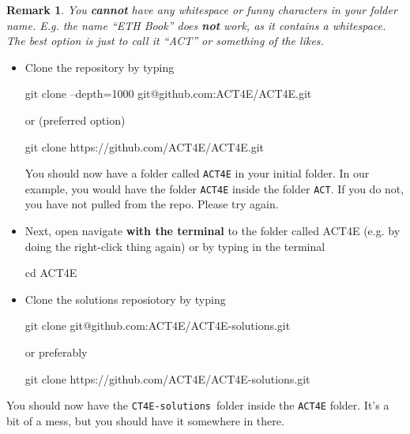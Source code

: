 \documentclass{article}
\newtheorem{remark}{Remark}
\begin{document}
    \begin{remark}
        You \textbf{cannot} have any whitespace or funny characters in your folder name.
        E.g. the name ``ETH Book'' does \textbf{not} work, as it contains a whitespace.
        The best option is just to call it ``ACT'' or something of the likes.
    \end{remark}
    \begin{itemize}
        \item Clone the repository by typing
              \begin{bashcode}
                  git clone --depth=1000 git@github.com:ACT4E/ACT4E.git
              \end{bashcode}
              or (preferred option)
              \begin{bashcode}
                  git clone https://github.com/ACT4E/ACT4E.git
              \end{bashcode}
              You should now have a folder called \texttt{ACT4E} in your initial folder.
              In our example, you would have the folder \texttt{ACT4E} inside the folder \texttt{ACT}.
              If you do not, you have not pulled from the repo.
              Please try again.
        \item Next, open navigate \textbf{with the terminal} to the folder called ACT4E (e.g. by doing the right-click thing again) or by typing in the terminal
              \begin{bashcode}
                  cd ACT4E
              \end{bashcode}
        \item Clone the solutions reposiotory by typing
              \begin{bashcode}
                  git clone git@github.com:ACT4E/ACT4E-solutions.git
              \end{bashcode}
              or preferably
              \begin{bashcode}
                  git clone https://github.com/ACT4E/ACT4E-solutions.git
              \end{bashcode}
    \end{itemize}
    You should now have the \texttt{CT4E-solutions} folder inside the \texttt{ACT4E} folder.
    It's a bit of a mess, but you should have it somewhere in there.
\end{document}
